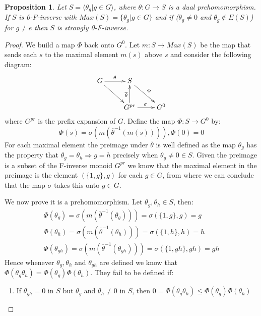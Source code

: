 \documentclass[11pt,]{amsbook}
\theoremstyle{plain}
\newtheorem{proposition}[theorem]{Proposition}%
\theoremstyle{definition}%
\theoremstyle{remark}%
\begin{document}
\begin{proposition}\label{Prop:Strongly}
Let $S = \langle \theta_{g} | g \in G \rangle$, where $\theta: G \rightarrow S$ is a dual prehomomorphism. If $S$ is 0-F-inverse with $Max(S) = \lbrace \theta_{g} | g \in G \rbrace$ and if  ($\theta_{g} \not = 0$ and $\theta_{g} \not \in E(S)$) for $g\not = e$ then $S$ is strongly 0-F-inverse.
\end{proposition}
\begin{proof}
We build a map $\Phi$ back onto $G^{0}$. Let $m: S \rightarrow Max(S)$ be the map that sends each $s$ to the maximal element $m(s)$ above $s$ and consider the following diagram:
\begin{equation*}
\xymatrix{
G\ar@{->}[r]^{\theta}\ar@{->}[dr]^{}  & S\ar@{->}[dr]^{\Phi}  & \\
  & G^{pr} \ar@{->}[r]^{\sigma}\ar@{->}[u]^{\overline{\theta}}  & G^{0}
}
\end{equation*}
where $G^{pr}$ is the prefix expansion of $G$. Define the map $\Phi:S \rightarrow G^{0}$ by:
\begin{equation*}
\Phi(s)=\sigma ( m ( \overline{\theta}^{-1} (m(s)))), \Phi(0)=0
\end{equation*}
For each maximal element the preimage under $\overline{\theta}$ is well defined as the map $\theta_{g}$ has the property that $\theta_{g}=\theta_{h} \Rightarrow g=h$ precisely when $\theta_{g} \not = 0 \in S$. Given the preimage is a subset of the F-inverse monoid $G^{pr}$ we know that the maximal element in the preimage is the element $(\lbrace 1,g \rbrace,g)$ for each $g \in G$, from where we can conclude that the map $\sigma$ takes this onto $g \in G$.

We now prove it is a prehomomorphism. Let $\theta_{g},\theta_{h} \in S$, then:
\begin{eqnarray*}
\Phi(\theta_{g})=\sigma ( m(\overline{\theta}^{-1}(\theta_{g}))) = \sigma ( \lbrace 1,g \rbrace, g)= g\\
\Phi(\theta_{h})=\sigma ( m(\overline{\theta}^{-1}(\theta_{h}))) = \sigma ( \lbrace 1,h \rbrace, h)= h\\
\Phi(\theta_{gh})=\sigma ( m(\overline{\theta}^{-1}(\theta_{gh}))) = \sigma ( \lbrace 1,gh \rbrace, gh)= gh
\end{eqnarray*}
Hence whenever $\theta_{g},\theta_{h}$ and $\theta_{gh}$ are defined we know that $\Phi(\theta_{g}\theta_{h})=\Phi(\theta_{g})\Phi(\theta_{h})$. They fail to be defined if:
\begin{enumerate}
\item If $\theta_{gh} = 0$ in $S$ but $\theta_{g}$ and $\theta_{h} \not = 0$ in $S$, then $0=\Phi(\theta_{g}\theta_{h})\leq \Phi(\theta_{g})\Phi(\theta_{h})$


\end{enumerate}
\end{proof}
\end{document}
